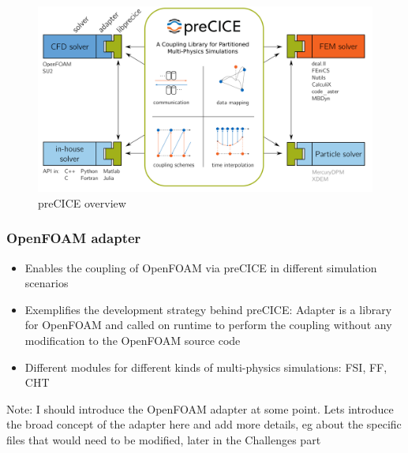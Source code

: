 \begin{figure}[t]
	\centering
	\includegraphics[width=0.9 \textwidth]{images/precice-overview.png}
	\caption{preCICE overview \cite{Chourdakis:2022}}
	\label{fig:precice:overview}
\end{figure}


\subsubsection{OpenFOAM adapter}
\begin{itemize}
	\item Enables the coupling of OpenFOAM via preCICE in different simulation scenarios
	\item Exemplifies the development strategy behind preCICE: Adapter is a library for OpenFOAM and called on runtime to perform the coupling without any modification to the OpenFOAM source code
	\item Different modules for different kinds of multi-physics simulations: FSI, FF, CHT
\end{itemize}	
Note:
I should introduce the OpenFOAM adapter at some point.
Lets introduce the broad concept of the adapter here and add more details, eg about the specific files that would need to be modified, later in the Challenges part
\newline
